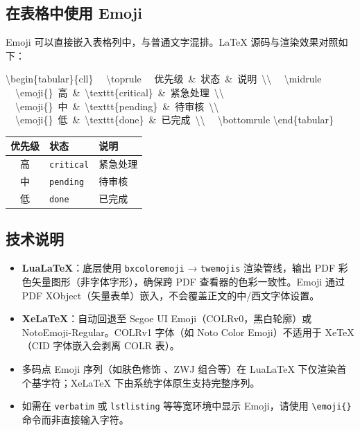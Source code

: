 \documentclass[redline, titleindent, zhlineskip]{gbt9704}
\begin{document}
\subsection{在表格中使用 Emoji}

Emoji 可以直接嵌入表格列中，与普通文字混排。LaTeX 源码与渲染效果对照如下：

\begin{center}
\begin{minipage}[t]{0.52\textwidth}
\raggedright\small\ttfamily
\textbackslash begin\{tabular\}\{cll\}\newline
\ \ \textbackslash toprule\newline
\ \ 优先级\ \&\ 状态\ \&\ 说明\ \textbackslash\textbackslash\newline
\ \ \textbackslash midrule\newline
\ \ \textbackslash emoji\{\}\ 高\ \&\ \textbackslash texttt\{critical\}\ \&\ 紧急处理\ \textbackslash\textbackslash\newline
\ \ \textbackslash emoji\{\}\ 中\ \&\ \textbackslash texttt\{pending\}\ \&\ 待审核\ \textbackslash\textbackslash\newline
\ \ \textbackslash emoji\{\}\ 低\ \&\ \textbackslash texttt\{done\}\ \&\ 已完成\ \textbackslash\textbackslash\newline
\ \ \textbackslash bottomrule\newline
\textbackslash end\{tabular\}
\end{minipage}
\hfill
\begin{minipage}[t]{0.40\textwidth}
\centering
\begin{tabular}{cll}
\toprule
优先级 & 状态 & 说明 \\
\midrule
\emoji{🔴} 高 & \texttt{critical} & 紧急处理 \\
\emoji{🟡} 中 & \texttt{pending}  & 待审核 \\
\emoji{🟢} 低 & \texttt{done}     & 已完成 \\
\bottomrule
\end{tabular}
\end{minipage}
\end{center}

\subsection{技术说明}
\begin{itemize}
  \item \textbf{LuaLaTeX}：底层使用 \texttt{bxcoloremoji} → \texttt{twemojis} 渲染管线，输出 PDF 彩色矢量图形（非字体字形），确保跨 PDF 查看器的色彩一致性。Emoji 通过 PDF XObject（矢量表单）嵌入，不会覆盖正文的中/西文字体设置。
  \item \textbf{XeLaTeX}：自动回退至 Segoe UI Emoji（COLRv0，黑白轮廓）或 NotoEmoji-Regular。COLRv1 字体（如 Noto Color Emoji）不适用于 XeTeX（CID 字体嵌入会剥离 COLR 表）。
  \item 多码点 Emoji 序列（如肤色修饰 、ZWJ 组合等）在 LuaLaTeX 下仅渲染首个基字符；XeLaTeX 下由系统字体原生支持完整序列。
  \item 如需在 \texttt{verbatim} 或 \texttt{lstlisting} 等等宽环境中显示 Emoji，请使用 \verb|\emoji{}| 命令而非直接输入字符。
\end{itemize}
\end{document}
